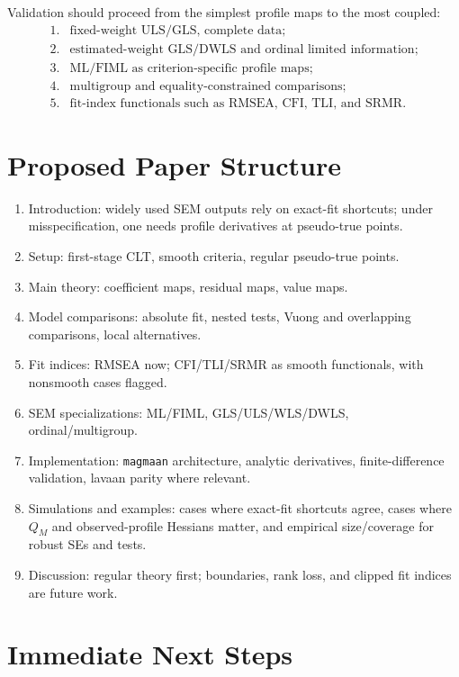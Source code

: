 \documentclass[11pt]{article}
\theoremstyle{plain}
\theoremstyle{remark}
\begin{document}
Validation should proceed from the simplest profile maps to the most coupled:
\[
\begin{array}{ll}
1. & \text{fixed-weight ULS/GLS, complete data;}\\
2. & \text{estimated-weight GLS/DWLS and ordinal limited information;}\\
3. & \text{ML/FIML as criterion-specific profile maps;}\\
4. & \text{multigroup and equality-constrained comparisons;}\\
5. & \text{fit-index functionals such as RMSEA, CFI, TLI, and SRMR.}
\end{array}
\]

\section{Proposed Paper Structure}

\begin{enumerate}
\item Introduction: widely used SEM outputs rely on exact-fit shortcuts; under
  misspecification, one needs profile derivatives at pseudo-true points.
\item Setup: first-stage CLT, smooth criteria, regular pseudo-true points.
\item Main theory: coefficient maps, residual maps, value maps.
\item Model comparisons: absolute fit, nested tests, Vuong and overlapping
  comparisons, local alternatives.
\item Fit indices: RMSEA now; CFI/TLI/SRMR as smooth functionals, with
  nonsmooth cases flagged.
\item SEM specializations: ML/FIML, GLS/ULS/WLS/DWLS, ordinal/multigroup.
\item Implementation: \texttt{magmaan} architecture, analytic derivatives,
  finite-difference validation, lavaan parity where relevant.
\item Simulations and examples: cases where exact-fit shortcuts agree, cases
  where $Q_M$ and observed-profile Hessians matter, and empirical size/coverage
  for robust SEs and tests.
\item Discussion: regular theory first; boundaries, rank loss, and clipped fit
  indices are future work.
\end{enumerate}

\section{Immediate Next Steps}
\end{document}
